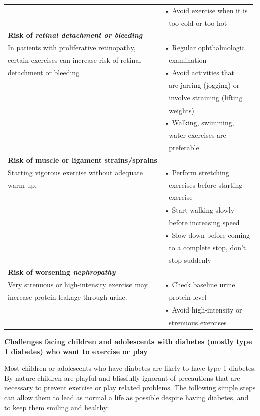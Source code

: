 {\begin{longtable}{|l|l|}
 & • Avoid exercise when it is\\
 & \,\, too cold or too hot\\
\hline
\textbf{Risk of \textit{retinal detachment\index{Retinal detachment} or bleeding}} & \\
In patients with proliferative retinopathy, & • Regular ophthalmologic\\
certain exercises can increase risk of retinal & \,\, examination\\
detachment or bleeding & • Avoid activities that\\
 & \,\, are jarring (jogging) or\\
 & \,\, involve straining (lifting\\
 & \,\, weights)\\
 & • Walking, swimming,\\
 & \,\, water exercises are\\
 & \,\, preferable\\
\hline
\textbf{Risk of muscle or ligament strains/sprains} & \\
Starting vigorous exercise without adequate & • Perform stretching\\
warm-up. & \,\, exercises before starting\\
 & \,\, exercise\\
 & • Start walking slowly\\
 & \,\, before increasing speed\\
 & • Slow down before coming\\
 & \,\, to a complete stop, don’t\\
 & \,\, stop suddenly\\
\hline
\textbf{Risk of worsening \textit{nephropathy\index{Nephropathy}}} & \\
Very strenuous or high-intensity exercise may & • Check baseline urine\\
increase protein leakage through urine. & \,\, protein level\\
 & • Avoid high-intensity or\\
 & \,\, strenuous exercises\\
\hline
\end{longtable}
}\relax

\noindent\textbf{Challenges facing children and adolescents with diabetes (mostly type 1 diabetes) who want to exercise or play}

Most children or adolescents who have diabetes are likely to have type 1 diabetes. By nature children are playful and blissfully ignorant of precautions that are necessary to prevent exercise or play related problems. The following simple steps can allow them to lead as normal a life as possible despite having diabetes, and to keep them smiling and healthy:

